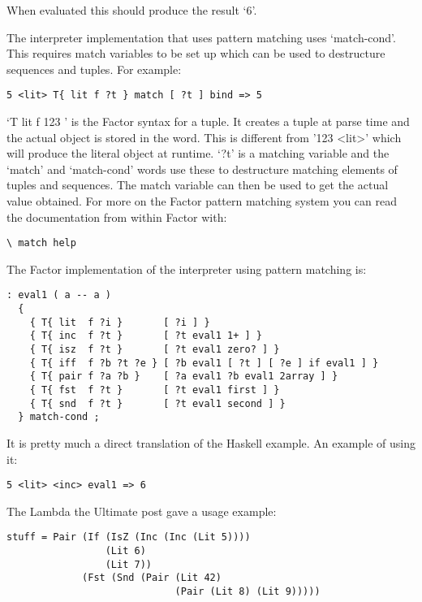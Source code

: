 When evaluated this should produce the result `6'.

The interpreter implementation that uses pattern matching uses
`match-cond'. This requires match variables to be set up which can be
used to destructure sequences and tuples. For example:

\begin{verbatim}
5 <lit> T{ lit f ?t } match [ ?t ] bind => 5
\end{verbatim}

`T{ lit f 123 }' is the Factor syntax for a tuple. It creates a tuple
at parse time and the actual object is stored in the word. This is
different from '123 <lit>' which will produce the literal object at
runtime. `?t' is a matching variable and the `match' and `match-cond'
words use these to destructure matching elements of tuples and
sequences. The match variable can then be used to get the actual value
obtained. For more on the Factor pattern matching system you can read
the documentation from within Factor with:

\begin{verbatim}
\ match help
\end{verbatim}

The Factor implementation of the interpreter using pattern matching
is:

\begin{verbatim}
: eval1 ( a -- a )
  {
    { T{ lit  f ?i }       [ ?i ] }
    { T{ inc  f ?t }       [ ?t eval1 1+ ] }
    { T{ isz  f ?t }       [ ?t eval1 zero? ] }
    { T{ iff  f ?b ?t ?e } [ ?b eval1 [ ?t ] [ ?e ] if eval1 ] }
    { T{ pair f ?a ?b }    [ ?a eval1 ?b eval1 2array ] }
    { T{ fst  f ?t }       [ ?t eval1 first ] }
    { T{ snd  f ?t }       [ ?t eval1 second ] }
  } match-cond ; 
\end{verbatim}

It is pretty much a direct translation of the Haskell example. An
example of using it:

\begin{verbatim}
5 <lit> <inc> eval1 => 6
\end{verbatim}

The Lambda the Ultimate post gave a usage example:

\begin{verbatim}
stuff = Pair (If (IsZ (Inc (Inc (Lit 5))))
                 (Lit 6)
                 (Lit 7))
             (Fst (Snd (Pair (Lit 42)
                             (Pair (Lit 8) (Lit 9)))))
\end{verbatim}


